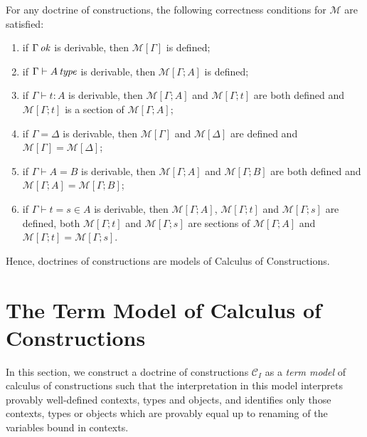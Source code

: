 \begin{theorem}
    For any doctrine of constructions, the following correctness conditions for $\mathcal{M}$ are satisfied:
    \begin{enumerate}
        \item if $\Gamma \operatorname{\mathit{\space ok}}$ is derivable, then $\mathcal{M}[\Gamma]$ is defined;
        \item if $\Gamma \vdash A \operatorname{\mathit{\space type}}$ is derivable, then $\mathcal{M}[\Gamma; A]$ is defined;
        \item if $\Gamma \vdash t \colon A$ is derivable, then $\mathcal{M}[\Gamma; A]$ and $\mathcal{M}[\Gamma; t]$
              are both defined and $\mathcal{M}[\Gamma; t]$ is a section of $\mathcal{M}[\Gamma; A]$;
        \item if $\Gamma = \Delta$ is derivable, then $\mathcal{M}[\Gamma]$ and $\mathcal{M}[\Delta]$ are defined 
              and $\mathcal{M}[\Gamma] = \mathcal{M}[\Delta]$;
        \item if $\Gamma \vdash A = B$ is derivable, then $\mathcal{M}[\Gamma; A]$ and $\mathcal{M}[\Gamma; B]$
              are both defined and $\mathcal{M}[\Gamma; A] = \mathcal{M}[\Gamma; B]$;
        \item if $\Gamma \vdash t = s \in A$ is derivable, then $\mathcal{M}[\Gamma; A]$, $\mathcal{M}[\Gamma; t]$
              and $\mathcal{M}[\Gamma; s]$ are defined, both $\mathcal{M}[\Gamma; t]$ and $\mathcal{M}[\Gamma; s]$
              are sections of $\mathcal{M}[\Gamma; A]$ and $\mathcal{M}[\Gamma; t] = \mathcal{M}[\Gamma; s]$.
    \end{enumerate}
\end{theorem}

Hence, doctrines of constructions are models of Calculus of Constructions.

\section{The Term Model of Calculus of Constructions}

In this section, we construct a doctrine of constructions $\mathcal{C}_I$ as a \textit{term model}
of calculus of constructions such that the interpretation in this model interprets provably well-defined
contexts, types and objects, and identifies only those contexts, types or objects which are provably equal
up to renaming of the variables bound in contexts.

